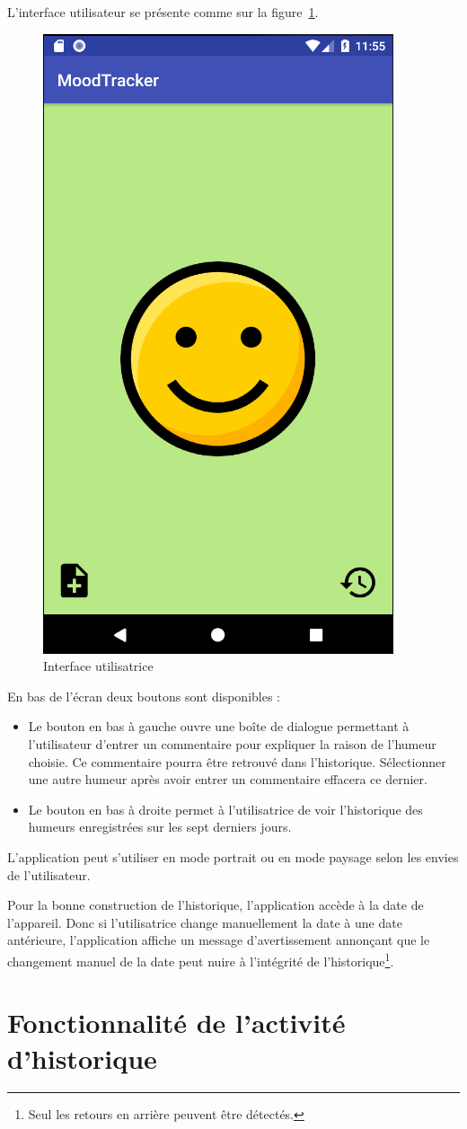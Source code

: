 \documentclass{article}[a4paper,12pt]
\begin{document}
L'interface utilisateur se présente comme sur la figure~\ref{interface}.
\begin{figure}
  \centering
  \includegraphics[width=.4\textwidth]{interface.png}
  \caption{Interface utilisatrice}
  \label{interface}
\end{figure}
En bas de l'écran deux boutons sont disponibles :
\begin{itemize}
\item Le bouton en bas à gauche ouvre une boîte de dialogue permettant à l'utilisateur d'entrer un commentaire pour expliquer la raison de l'humeur choisie. Ce commentaire pourra être retrouvé dans l'historique. Sélectionner une autre humeur après avoir entrer un commentaire effacera ce dernier. 
\item Le bouton en bas à droite permet à l'utilisatrice de voir l'historique des humeurs enregistrées sur les sept derniers jours.
\end{itemize}

L'application peut s'utiliser en mode portrait ou en mode paysage selon les envies de l'utilisateur.

Pour la bonne construction de l'historique, l'application accède à la date de l'appareil. Donc si l'utilisatrice change manuellement la date à une date antérieure, l'application affiche un message d'avertissement annonçant que le changement manuel de la date peut nuire à l'intégrité de l'historique\footnote{Seul les retours en arrière peuvent être détectés.}.

\section{Fonctionnalité de l'activité d'historique}
\end{document}
